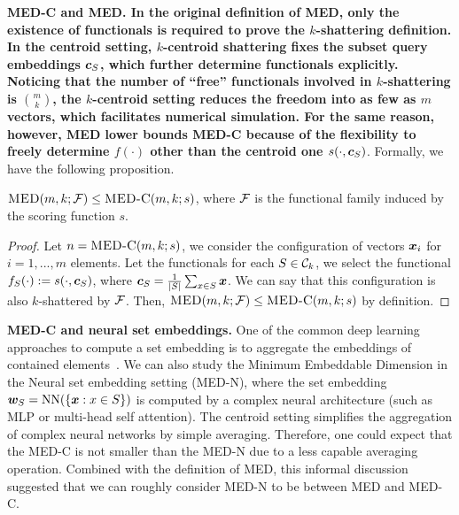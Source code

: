 \textbf{MED-C and MED. In the original definition of MED, only the existence of functionals is required to prove the $k$-shattering definition. In the centroid setting, $k$-centroid shattering fixes the subset query embeddings $\bm{c}_S$, which further determine functionals explicitly. Noticing that the number of ``free'' functionals involved in $k$-shattering is $\binom{m}{k}$, the $k$-centroid setting reduces the freedom into as few as $m$ vectors, which facilitates numerical simulation. For the same reason, however, MED lower bounds MED-C because of the flexibility to freely determine $f(\cdot)$ other than the centroid one $s(\cdot, \bm{c}_S)$}. Formally, we have the following proposition.
\begin{proposition}
    $\textsc{MED}(m, k; \mathcal{F}) \leq \textsc{MED-C} (m, k; s)$, where $\mathcal{F}$ is the functional family induced by the scoring function $s$.
\end{proposition}
\begin{proof}
    Let $n = \textsc{MED-C}(m, k; s)$, we consider the configuration of vectors $\bm{x}_i$ for $i=1,...,m$ elements. Let the functionals for each $S\in \mathcal{C}_k$, we select the functional $f_S(\cdot) := s(\cdot, \bm{c}_S)$, where $\bm{c}_S =\frac{1}{|S|} \sum_{x \in S} \bm{x}$. We can say that this configuration is also $k$-shattered by $\mathcal{F}$. Then, $\textsc{MED}(m, k; \mathcal{F}) \leq \textsc{MED-C}(m,k;s)$ by definition.
\end{proof}

\textbf{MED-C and neural set embeddings.} One of the common deep learning approaches to compute a set embedding is to aggregate the embeddings of contained elements~\citep{zaheer2017deep}. We can also study the Minimum Embeddable Dimension in the Neural set embedding setting (MED-N), where the set embedding $\bm{w}_S = {\rm NN}(\{\bm{x}: x \in S\})$ is computed by a complex neural architecture (such as MLP or multi-head self attention). The centroid setting simplifies the aggregation of complex neural networks by simple averaging. Therefore, one could expect that the MED-C is not smaller than the MED-N due to a less capable averaging operation. Combined with the definition of MED, this informal discussion suggested that we can roughly consider MED-N to be between MED and MED-C.
